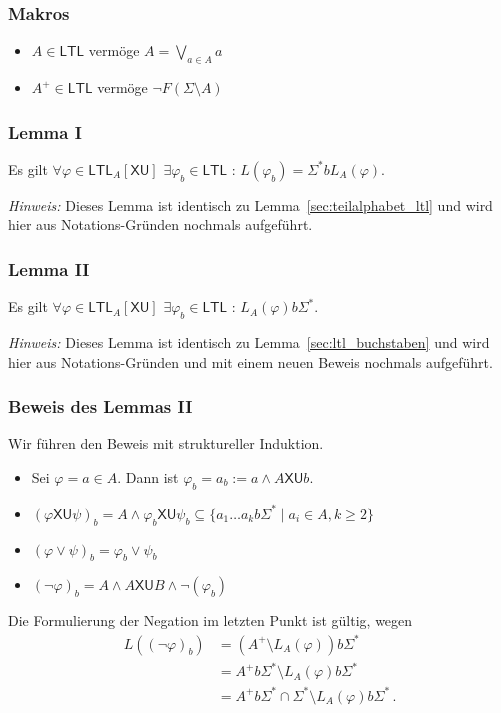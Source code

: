 \documentclass[12pt, german]{article}
\newcommand{\sigstern}{\Sigma^\ast}
\newcommand{\ltl}{\mathsf{LTL}}
\newcommand{\sX}{\mathsf{X}}
\newcommand{\sU}{\mathsf{U}}
\begin{document}
\subsubsection{Makros}
	\begin{itemize}
		\item $A \in \ltl$ vermöge $A = \bigvee_{a \in A} a$
		\item $A^+ \in \ltl$ vermöge $\neg F(\Sigma \setminus A)$ 
	\end{itemize}

\subsubsection{Lemma I}
	 Es gilt $\forall \varphi \in \ltl_A[\sX\sU]$  $\exists \varphi_b \in \ltl$ : $L(\varphi_b) = \sigstern b L_A(\varphi)$.
	 \newline

	\textit{Hinweis: } Dieses Lemma ist identisch zu Lemma~\ref{sec:teilalphabet_ltl} und wird hier aus Notations-Gründen nochmals aufgeführt. 

\subsubsection{Lemma II}
	 Es gilt $\forall \varphi \in \ltl_A[\sX\sU]$  $\exists \varphi_b \in \ltl$ : $L_A(\varphi)b \sigstern$.\newline
	
	\textit{Hinweis: } Dieses Lemma ist identisch zu Lemma~\ref{sec:ltl_buchstaben} und wird hier aus Notations-Gründen und mit einem neuen Beweis nochmals aufgeführt. 
	
\subsubsection{Beweis des Lemmas II}
	Wir führen den Beweis mit struktureller Induktion. 
	\begin{itemize}
		\item Sei $\varphi = a \in A$. Dann ist $\varphi_b = a_b := a \land A \sX \sU b$.
		\item $(\varphi \sX \sU \psi)_b = A \land \varphi_b \sX\sU\psi_b \subseteq \{a_1\ldots a_kb\sigstern \mid a_i \in A, k \geq 2\}$
		\item $(\varphi \lor \psi)_b = \varphi_b \lor \psi_b$ 
		\item  $(\neg \varphi)_b = A \land A \sX\sU B  \land \neg (\varphi_b)$
	\end{itemize}
	Die Formulierung der Negation im letzten Punkt ist gültig, wegen
		\begin{align*}
			L((\neg \varphi)_b) &= (A^+ \setminus L_A(\varphi))b\sigstern \\
			&= A^+b\sigstern \setminus L_A(\varphi)b\sigstern \\
			&=A^+b\sigstern \cap \sigstern \setminus  L_A(\varphi)b\sigstern\, .
		\end{align*} 
\end{document}

